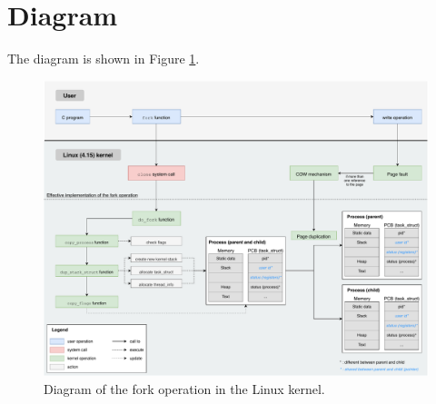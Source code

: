 \documentclass[a4paper, 12pt]{article}
\begin{document}
    
    \newpage
    \appendix
    \section*{Diagram}
    
    The diagram is shown in Figure \ref{fig:diagram.fork}.
    
    \begin{figure}[H]
        \centering
        \includegraphics[width=\textwidth]{resources/pdf/diagram.pdf}
        \caption{Diagram of the fork operation in the Linux kernel.}
        \label{fig:diagram.fork}
    \end{figure}
    
    
    \newpage
    \nocite{*}
    \printbibliography
\end{document}
